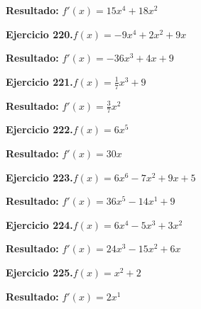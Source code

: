 \documentclass[10pt,a4paper]{article}
\begin{document}
\begin{solbox}
\textbf{Resultado:} \(\displaystyle f'(x) = 15x^{4} +18x^{2}\)
\end{solbox}

\newpage
\begin{ejbox}
\textbf{Ejercicio 220.}\quad $f(x) = -9x^{4} +2x^2 +9x$
\end{ejbox}

\begin{solbox}
\textbf{Resultado:} \(\displaystyle f'(x) = -36x^{3} +4x +9\)
\end{solbox}

\begin{ejbox}
\textbf{Ejercicio 221.}\quad $f(x) = \frac{1}{7}x^{3} +9$
\end{ejbox}

\begin{solbox}
\textbf{Resultado:} \(\displaystyle f'(x) = \frac{3}{7}x^{2}\)
\end{solbox}

\begin{ejbox}
\textbf{Ejercicio 222.}\quad $f(x) = 6x^{5}$
\end{ejbox}

\begin{solbox}
\textbf{Resultado:} \(\displaystyle f'(x) = 30x\)
\end{solbox}

\newpage
\begin{ejbox}
\textbf{Ejercicio 223.}\quad $f(x) = 6x^{6} -7x^{2} +9x +5$
\end{ejbox}

\begin{solbox}
\textbf{Resultado:} \(\displaystyle f'(x) = 36x^{5} -14x^{1} +9\)
\end{solbox}

\begin{ejbox}
\textbf{Ejercicio 224.}\quad $f(x) = 6x^4 -5x^3 +3x^2$
\end{ejbox}

\begin{solbox}
\textbf{Resultado:} \(\displaystyle f'(x) = 24x^3 -15x^2 +6x\)
\end{solbox}

\begin{ejbox}
\textbf{Ejercicio 225.}\quad $f(x) = x^{2} +2$
\end{ejbox}

\begin{solbox}
\textbf{Resultado:} \(\displaystyle f'(x) = 2x^{1}\)
\end{solbox}
\end{document}
